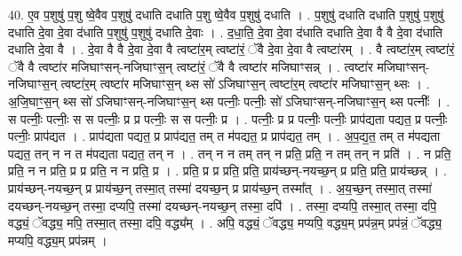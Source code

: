 \documentclass[17pt]{extarticle}
\begin{document}
40. ए॒व प॒शुषु॑ प॒शु ष्वे॒वैव प॒शुषु॑ दधाति दधाति प॒शु ष्वे॒वैव प॒शुषु॑ दधाति । . प॒शुषु॑ दधाति दधाति प॒शुषु॑ प॒शुषु॑ दधाति दे॒वा दे॒वा द॑धाति प॒शुषु॑ प॒शुषु॑ दधाति दे॒वाः । . द॒धा॒ति॒ दे॒वा दे॒वा द॑धाति दधाति दे॒वा वै वै दे॒वा द॑धाति दधाति दे॒वा वै । . दे॒वा वै वै दे॒वा दे॒वा वै त्वष्टा॑र॒म् त्वष्टा॑रं॒ ॅवै दे॒वा दे॒वा वै त्वष्टा॑रम् । . वै त्वष्टा॑र॒म् त्वष्टा॑रं॒ ॅवै वै त्वष्टा॑र मजिघाꣳसन्-नजिघाꣳस॒न् त्वष्टा॑रं॒ ॅवै वै त्वष्टा॑र मजिघाꣳसन्न् । . त्वष्टा॑र मजिघाꣳसन्-नजिघाꣳस॒न् त्वष्टा॑र॒म् त्वष्टा॑र मजिघाꣳस॒न् थ्स सो॑ ऽजिघाꣳस॒न् त्वष्टा॑र॒म् त्वष्टा॑र मजिघाꣳस॒न् थ्सः । . अ॒जि॒घाꣳ॒॒स॒न् थ्स सो॑ ऽजिघाꣳसन्-नजिघाꣳस॒न् थ्स पत्नीः॒ पत्नीः॒ सो॑ ऽजिघाꣳसन्-नजिघाꣳस॒न् थ्स पत्नीः᳚ । . स पत्नीः॒ पत्नीः॒ स स पत्नीः॒ प्र प्र पत्नीः॒ स स पत्नीः॒ प्र । . पत्नीः॒ प्र प्र पत्नीः॒ पत्नीः॒ प्राप॑द्यता पद्यत॒ प्र पत्नीः॒ पत्नीः॒ प्राप॑द्यत । . प्राप॑द्यता पद्यत॒ प्र प्राप॑द्यत॒ तम् त म॑पद्यत॒ प्र प्राप॑द्यत॒ तम् । . अ॒प॒द्य॒त॒ तम् त म॑पद्यता पद्यत॒ तन् न न त म॑पद्यता पद्यत॒ तन् न । . तन् न न तम् तन् न प्रति॒ प्रति॒ न तम् तन् न प्रति॑ । . न प्रति॒ प्रति॒ न न प्रति॒ प्र प्र प्रति॒ न न प्रति॒ प्र । . प्रति॒ प्र प्र प्रति॒ प्रति॒ प्राय॑च्छन्-नयच्छ॒न् प्र प्रति॒ प्रति॒ प्राय॑च्छन्न् । . प्राय॑च्छन्-नयच्छ॒न् प्र प्राय॑च्छ॒न् तस्मा॒त् तस्मा॑ दयच्छ॒न् प्र प्राय॑च्छ॒न् तस्मा᳚त् । . अ॒य॒च्छ॒न् तस्मा॒त् तस्मा॑ दयच्छन्-नयच्छ॒न् तस्मा॒ दप्यपि॒ तस्मा॑ दयच्छन्-नयच्छ॒न् तस्मा॒ दपि॑ । . तस्मा॒ दप्यपि॒ तस्मा॒त् तस्मा॒ दपि॒ वद्ध्यं॒ ॅवद्ध्य॒ मपि॒ तस्मा॒त् तस्मा॒ दपि॒ वद्ध्य᳚म् । . अपि॒ वद्ध्यं॒ ॅवद्ध्य॒ मप्यपि॒ वद्ध्य॒म् प्रप॑न्न॒म् प्रप॑न्नं॒ ॅवद्ध्य॒ मप्यपि॒ वद्ध्य॒म् प्रप॑न्नम् । \newline
\pagebreak
{}
\end{document}
